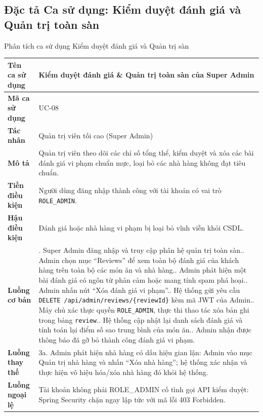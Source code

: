 \documentclass{uetgraduation}
\begin{document}
\clearpage
\subsection{Đặc tả Ca sử dụng: Kiểm duyệt đánh giá và Quản trị toàn sàn}
\begin{table}[!htbp]{Phân tích ca sử dụng Kiểm duyệt đánh giá và Quản trị sàn}
\centering
\small
\begin{tabularx}{\textwidth}{|l|>{\raggedright\arraybackslash}X|}
\hline
\textbf{Tên ca sử dụng} & \textbf{Kiểm duyệt đánh giá \& Quản trị toàn sàn của Super Admin} \\ \hline
\textbf{Mã ca sử dụng} & UC-08 \\ \hline
\textbf{Tác nhân} & Quản trị viên tối cao (Super Admin) \\ \hline
\textbf{Mô tả} & Quản trị viên theo dõi các chỉ số tổng thể, kiểm duyệt và xóa các bài đánh giá vi phạm chuẩn mực, loại bỏ các nhà hàng không đạt tiêu chuẩn. \\ \hline
\textbf{Tiền điều kiện} & Người dùng đăng nhập thành công với tài khoản có vai trò \texttt{ROLE\_ADMIN}. \\ \hline
\textbf{Hậu điều kiện} & Đánh giá hoặc nhà hàng vi phạm bị loại bỏ vĩnh viễn khỏi CSDL. \\ \hline
\textbf{Luồng cơ bản} & 
1. Super Admin đăng nhập và truy cập phân hệ quản trị toàn sàn.\newline
2. Admin chọn mục ``Reviews'' để xem toàn bộ đánh giá của khách hàng trên toàn bộ các món ăn và nhà hàng.\newline
3. Admin phát hiện một bài đánh giá có ngôn từ phản cảm hoặc mang tính spam phá hoại.\newline
4. Admin nhấn nút ``Xóa đánh giá vi phạm''.\newline
5. Hệ thống gửi yêu cầu \texttt{DELETE /api/admin/reviews/\{reviewId\}} kèm mã JWT của Admin.\newline
6. Máy chủ xác thực quyền \texttt{ROLE\_ADMIN}, thực thi thao tác xóa bản ghi trong bảng \texttt{review}.\newline
7. Hệ thống cập nhật lại danh sách đánh giá và tính toán lại điểm số sao trung bình của món ăn.\newline
8. Admin nhận được thông báo đã gỡ bỏ thành công đánh giá vi phạm. \\ \hline
\textbf{Luồng thay thế} & 
3a. Admin phát hiện nhà hàng có dấu hiệu gian lận: Admin vào mục Quản trị nhà hàng và nhấn ``Xóa nhà hàng''; hệ thống xác nhận và thực hiện vô hiệu hóa/xóa nhà hàng đó khỏi hệ thống. \\ \hline
\textbf{Luồng ngoại lệ} & 
Tài khoản không phải ROLE\_ADMIN cố tình gọi API kiểm duyệt: Spring Security chặn ngay lập tức với mã lỗi 403 Forbidden. \\ \hline
\end{tabularx}
\end{table}
\end{document}
